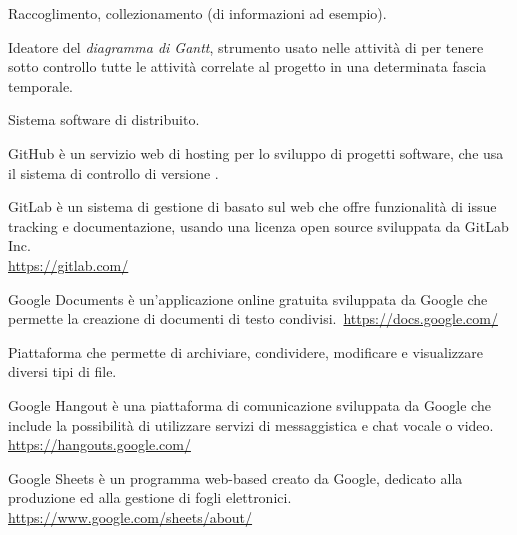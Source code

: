 Raccoglimento, collezionamento (di informazioni ad esempio).

Ideatore del \textit{diagramma di Gantt}, strumento usato nelle attività di  per tenere sotto controllo tutte le attività correlate al progetto in una determinata fascia temporale.

Sistema software di  distribuito.

GitHub è un servizio web di hosting per lo sviluppo di progetti software, che usa il sistema di controllo di versione .

GitLab è un sistema di gestione di   basato sul web che offre funzionalità di issue tracking e documentazione, usando una licenza open source sviluppata da GitLab Inc.\\
\url{https://gitlab.com/}

Google Documents è un’applicazione online gratuita sviluppata da Google che permette la creazione di documenti di testo condivisi.\
\url{https://docs.google.com/}

Piattaforma che permette di archiviare, condividere, modificare e visualizzare diversi tipi di file.

Google Hangout è una piattaforma di comunicazione sviluppata da Google che include la possibilità di utilizzare servizi di messaggistica e chat vocale o video.\\
\url{https://hangouts.google.com/}

Google Sheets è un programma web-based creato da Google, dedicato alla produzione ed alla gestione di fogli elettronici.\\
\url{https://www.google.com/sheets/about/}
\clearpage